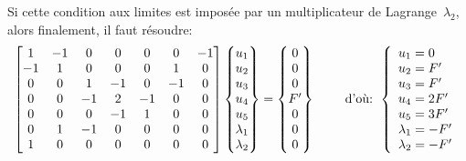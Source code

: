 Si cette condition aux limites est imposée par un multiplicateur de Lagrange~$\lambda_2$, alors finalement, il faut résoudre:
\begin{equation}
\MM*{1&-1&0&0&0&0&-1 \\ -1&1&0&0&0&1&0 \\ 0&0&1&-1&0&-1&0\\ 
0&0&-1&2&-1&0&0\\ 0&0&0&-1&1&0&0 \\ 0&1&-1&0&0&0&0 \\ 1&0&0&0&0&0&0}
\VV*{u_1\\u_2\\u_3\\u_4\\ u_5\\ \lambda_1 \\ \lambda_2}
=
\VV*{0\\0\\0\\F' \\ 0 \\ 0 \\ 0}
\qquad \text{ d'où: } 
\left\{\begin{array}{l} u_1=0 \\ u_2=F' \\ u_3=F' \\ u_4=2F' \\ u_5=3F' \\ \lambda_1 = -F' \\ \lambda_2 = -F' \end{array}\right.
\end{equation}